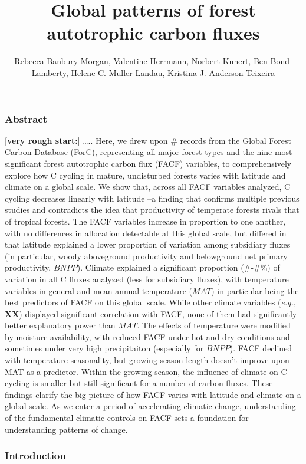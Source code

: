 \documentclass[]{article}
\title{Global patterns of forest autotrophic carbon fluxes}
\author{Rebecca Banbury Morgan, Valentine Herrmann, Norbert Kunert, Ben
Bond-Lamberty, Helene C. Muller-Landau, Kristina J. Anderson-Teixeira}
\date{}
\begin{document}
\maketitle

\subsubsection{Abstract}\label{abstract}

{[}\textbf{very rough start:}{]} \ldots{}.. Here, we drew upon \#
records from the Global Forest Carbon Database (ForC), representing all
major forest types and the nine most significant forest autotrophic
carbon flux (FACF) variables, to comprehensively explore how C cycling
in mature, undisturbed forests varies with latitude and climate on a
global scale. We show that, across all FACF variables analyzed, C
cycling decreases linearly with latitude --a finding that confirms
multiple previous studies and contradicts the idea that productivity of
temperate forests rivals that of tropical forests. The FACF variables
increase in proportion to one another, with no differences in allocation
detectable at this global scale, but differed in that latitude explained
a lower proportion of variation among subsidiary fluxes (in particular,
woody aboveground productivity and belowground net primary productivity,
\(BNPP\)). Climate explained a significant proportion (\#-\#\%) of
variation in all C fluxes analyzed (less for subsidiary fluxes), with
temperature variables in general and mean annual temperature (\(MAT\))
in particular being the best predictors of FACF on this global scale.
While other climate variables (\emph{e.g.}, \textbf{XX}) displayed
significant correlation with FACF, none of them had significantly better
explanatory power than \(MAT\). The effects of temperature were modified
by moisture availability, with reduced FACF under hot and dry conditions
and sometimes under very high precipitaiton (especially for \(BNPP\)).
FACF declined with temperature seasonality, but growing season length
doesn't improve upon MAT as a predictor. Within the growing season, the
influence of climate on C cycling is smaller but still significant for a
number of carbon fluxes. These findings clarify the big picture of how
FACF varies with latitude and climate on a global scale. As we enter a
period of accelerating climatic change, understanding of the fundamental
climatic controls on FACF sets a foundation for understanding patterns
of change.

\subsubsection{Introduction}\label{introduction}
\end{document}
